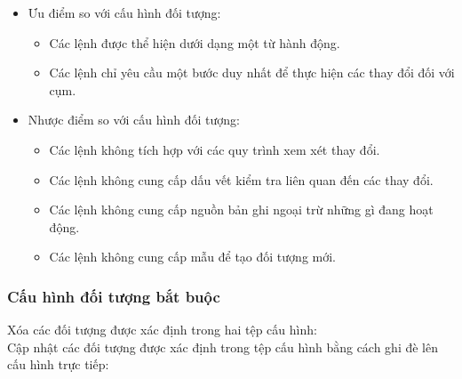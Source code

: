 \documentclass[12pt,a4paper]{report}
\begin{document}
	\begin{itemize}
		\item Ưu điểm so với cấu hình đối tượng:
		\begin{itemize}
			\item Các lệnh được thể hiện dưới dạng một từ hành động.
			\item Các lệnh chỉ yêu cầu một bước duy nhất để thực hiện các thay đổi đối với cụm.
		\end{itemize}
		\item Nhược điểm so với cấu hình đối tượng:
		\begin{itemize}
			\item Các lệnh không tích hợp với các quy trình xem xét thay đổi.
			\item Các lệnh không cung cấp dấu vết kiểm tra liên quan đến các thay đổi.
			\item Các lệnh không cung cấp nguồn bản ghi ngoại trừ những gì đang hoạt động.
			\item Các lệnh không cung cấp mẫu để tạo đối tượng mới.
		\end{itemize}
	\end{itemize}
	
	\subsubsection{Cấu hình đối tượng bắt buộc}
	\smallskip
	
	Xóa các đối tượng được xác định trong hai tệp cấu hình:\\
	Cập nhật các đối tượng được xác định trong tệp cấu hình bằng cách ghi đè lên cấu hình trực tiếp:\\
	
\end{document}
